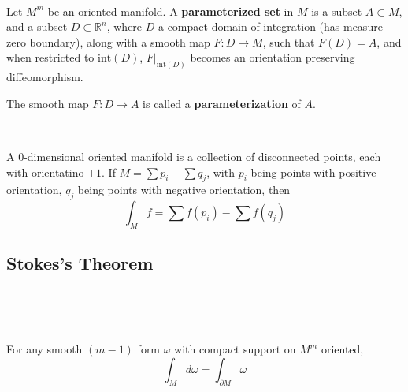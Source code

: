 \documentclass{article}
\begin{document}
\begin{definition}
  \

  Let $M^m$ be an oriented manifold. A \textbf{parameterized set} in $M$ is a subset $A \subset M$, and a subset $D \subset \mathbb{R}^n$, where $D$ a compact domain of integration (has measure zero boundary), along with a smooth map $F: D \to M$, such that $F(D) = A$, and when restricted to $\text{int}(D)$, $F \vert_{\text{int}(D)}$ becomes an orientation preserving diffeomorphism.

  The smooth map $F: D \to A$ is called a \textbf{parameterization} of $A$.
\end{definition}

\begin{example}
  \

  A $0$-dimensional oriented manifold is a collection of disconnected points, each with orientatino $\pm 1$. If $M = \sum p_i - \sum q_j$, with $p_i$ being points with positive orientation, $q_j$ being points with negative orientation, then $$\int_M f = \sum f(p_i) - \sum f(q_j)$$
\end{example}

\subsection{Stokes's Theorem}
\

\begin{theorem}
  \

  For any smooth $(m-1)$ form $\omega$ with compact support on $M^m$ oriented, $$\int_M d\omega = \int_{\partial M} \omega$$
\end{theorem}
\end{document}
